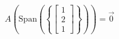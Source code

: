 \documentclass[preview]{standalone}
\begin{document}
\begin{align*}
A(\text{Span}\left(\left\{\begin{bmatrix} 1 \\ 2 \\ 1 \end{bmatrix}\right\}\right)) = \vec{0}
\end{align*}
\end{document}
